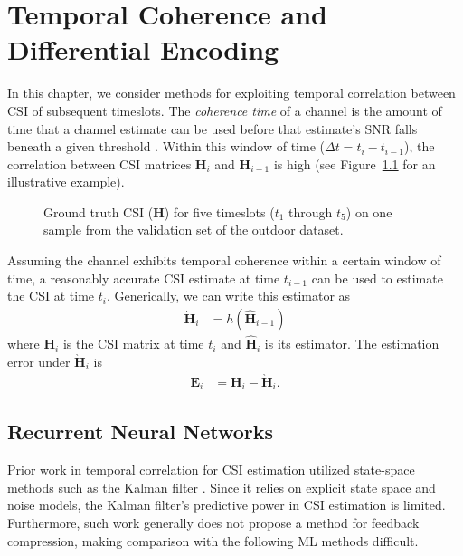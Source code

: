\chapter{Temporal Coherence and Differential Encoding}
\label{chap:markovnet}

In this chapter, we consider methods for exploiting temporal correlation between CSI of subsequent timeslots. The \emph{coherence time} of a channel is the amount of time that a channel estimate can be used before that estimate's SNR falls beneath a given threshold \cite{ref:Chopra2016ChannelAging}. Within this window of time ($\Delta t = t_i - t_{i-1}$), the correlation between CSI matrices $\mathbf H_{i}$ and $\mathbf H_{i-1}$ is high (see Figure~\ref{fig:csi_img_gt} for an illustrative example). 

\begin{figure}[htb] \centering 
{
  \fontsize{10pt}{12pt}
  \def\svgwidth{1.0\columnwidth}
  
}
  \caption{Ground truth CSI ($\mathbf H$) for five timeslots ($t_1$ through $t_5$) on one sample from the validation set of the outdoor dataset.} 
  \label{fig:csi_img_gt} 
\end{figure}


Assuming the channel exhibits temporal coherence within a certain window of time,
a reasonably accurate CSI estimate at time $t_{i-1}$ can be used to estimate the CSI at time $t_i$.
Generically, we can write this estimator as
\begin{align}
\grave{\mathbf H}_i &= h(\hat{\mathbf H}_{i-1}) \label{eq:gen_estim}
\end{align}
where $\mathbf{H}_i$ is the CSI matrix at time $t_i$ and $\hat{\mathbf H}_i$ is its estimator. 
The estimation error under $\grave{\mathbf H}_i$ is
\begin{align}
\mathbf E_{i} &= \mathbf H_{i} - \grave{\mathbf H}_{i}. \label{eq:diff_err}
\end{align}

\section{Recurrent Neural Networks}

Prior work in temporal correlation for CSI estimation utilized state-space methods such as the Kalman filter \cite{ref:Huber2006improved,ref:Ali2020BayesKalmanFilter,ref:Kim2021KalmanVsML}. Since it relies on explicit state space and noise models, the Kalman filter's predictive power in CSI estimation is limited. Furthermore, such work generally does not propose a method for feedback compression, making comparison with the following ML methods difficult.

